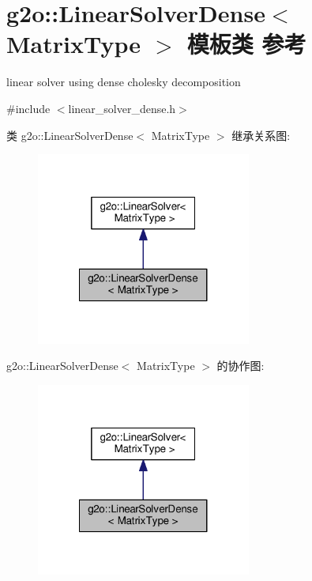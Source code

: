 \hypertarget{classg2o_1_1LinearSolverDense}{\section{g2o\-:\-:Linear\-Solver\-Dense$<$ Matrix\-Type $>$ 模板类 参考}
\label{classg2o_1_1LinearSolverDense}
}


linear solver using dense cholesky decomposition  




{\ttfamily \#include $<$linear\-\_\-solver\-\_\-dense.\-h$>$}



类 g2o\-:\-:Linear\-Solver\-Dense$<$ Matrix\-Type $>$ 继承关系图\-:
\nopagebreak
\begin{figure}[H]
\begin{center}
\leavevmode
\includegraphics[width=200pt]{classg2o_1_1LinearSolverDense__inherit__graph}
\end{center}
\end{figure}


g2o\-:\-:Linear\-Solver\-Dense$<$ Matrix\-Type $>$ 的协作图\-:
\nopagebreak
\begin{figure}[H]
\begin{center}
\leavevmode
\includegraphics[width=200pt]{classg2o_1_1LinearSolverDense__coll__graph}
\end{center}
\end{figure}
